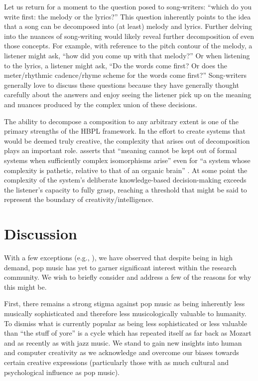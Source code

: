 \documentclass[letterpaper]{article}
\begin{document}
Let us return for a moment to the question posed to song-writers: ``which do you write first: the melody or the lyrics?'' This question inherently points to the idea that a song can be decomposed into (at least) melody and lyrics. Further delving into the nuances of song-writing would likely reveal further decomposition of even those concepts. For example, with reference to the pitch contour of the melody, a listener might ask, ``how did you come up with that melody?'' Or when listening to the lyrics, a listener might ask, ``Do the words come first? Or does the meter/rhythmic cadence/rhyme scheme for the words come first?'' Song-writers generally love to discuss these questions because they have generally thought carefully about the answers and enjoy seeing the listener pick up on the meaning and nuances produced by the complex union of these decisions. 

The ability to decompose a composition to any arbitrary extent is one of the primary strengths of the HBPL framework. In the effort to create systems that would be deemed truly creative, the complexity that arises out of decomposition plays an important role. \citeauthor{hofstadter1980godel} asserts that ``meaning cannot be kept out of formal systems when sufficiently complex isomorphisms arise'' even for ``a system whose complexity is pathetic, relative to that of an organic brain'' \cite{hofstadter1980godel}. At some point the complexity of the system's deliberate knowledge-based decision-making exceeds the listener's capacity to fully grasp, reaching a threshold that might be said to represent the boundary of creativity/intelligence.

\section{Discussion}

With a few exceptions (e.g., \cite{chuan2011generating}), we have observed that despite being in high demand, pop music has yet to garner significant interest within the research community. We wish to briefly consider and address a few of the reasons for why this might be.

First, there remains a strong stigma against pop music as being inherently less musically sophisticated and therefore less musicologically valuable to humanity. To dismiss what is currently popular as being less sophisticated or less valuable than ``the stuff of yore'' is a cycle which has repeated itself as far back as Mozart and as recently as with jazz music. We stand to gain new insights into human and computer creativity as we acknowledge and overcome our biases towards certain creative expressions (particularly those with as much cultural and psychological influence as pop music).
\end{document}
